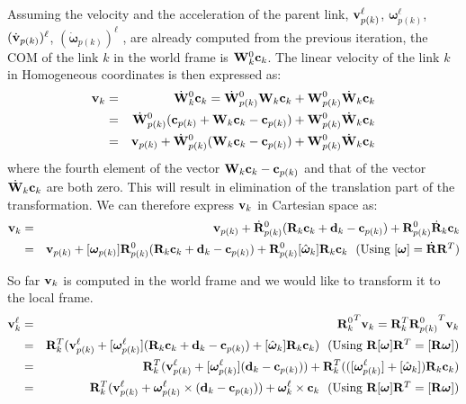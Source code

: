 Assuming the velocity and the acceleration of the parent
link, $\mathbf{v}_{p(k)}^\ell$, $\bm{\omega}_{p(k)}^\ell$,
$(\dot{\mathbf{v}}_{p(k)})^\ell$, $(\dot{\bm{\omega}}_{p(k)})^\ell$ , are
already computed from the previous iteration, the COM of the link $k$ in
the world frame is $\mathbf{W}^0_k \mathbf{c}_k$. The linear velocity of the
link $k$ in Homogeneous coordinates is then expressed as:
\begin{eqnarray}
\label{eqn:global_vel}
\mathbf{v}_k &=& \dot{\mathbf{W}}^0_k \mathbf{c}_k =  \dot{\mathbf{W}}^0_{p(k)} \mathbf{W}_k
\mathbf{c}_k + \mathbf{W}^0_{p(k)} \dot{\mathbf{W}}_k \mathbf{c}_k \nonumber \\ 
 &=& \dot{\mathbf{W}}^0_{p(k)} (\mathbf{c}_{p(k)} + \mathbf{W}_k \mathbf{c}_k -
\mathbf{c}_{p(k)}) + \mathbf{W}^0_{p(k)} \dot{\mathbf{W}}_k \mathbf{c}_k \nonumber \\
&=& \mathbf{v}_{p(k)} + \dot{\mathbf{W}}^0_{p(k)} (\mathbf{W}_k \mathbf{c}_k -
\mathbf{c}_{p(k)}) +\mathbf{W}^0_{p(k)} \dot{\mathbf{W}}_k \mathbf{c}_k
\end{eqnarray}
where the fourth element of the vector $\mathbf{W}_k \mathbf{c}_k -
\mathbf{c}_{p(k)}$ and that of the vector $\dot{\mathbf{W}}_k \mathbf{c}_k$ are both zero. This will
result in elimination of the translation part of the
transformation. We can therefore express $\mathbf{v}_k$ in Cartesian space
as:
\begin{eqnarray}
\mathbf{v}_k &=& \mathbf{v}_{p(k)} + \dot{\mathbf{R}}^0_{p(k)} (\mathbf{R}_k \mathbf{c}_k
+ \mathbf{d}_k - \mathbf{c}_{p(k)}) +\mathbf{R}^0_{p(k)} \dot{\mathbf{R}}_k \mathbf{c}_k \nonumber \\
&=& \mathbf{v}_{p(k)} + [\bm{\omega}_{p(k)}]\mathbf{R}^0_{p(k)} (\mathbf{R}_k
\mathbf{c}_k + \mathbf{d}_k -\mathbf{c}_{p(k)}) +\mathbf{R}^0_{p(k)}
[\hat{\bm{\omega}}_k]\mathbf{R}_k \mathbf{c}_k \mbox{\ \ (Using $[\bm{\omega}] = \dot{\mathbf{R}} \mathbf{R}^T$)}
\end{eqnarray}

So far $\mathbf{v}_k$ is computed in the world frame and we would like to
transform it to the local frame.
\begin{eqnarray}
\vc{v}_k^\ell &=& {\vc{R}_k^0}^T \vc{v}_k = \vc{R}_k^T
{\vc{R}^0_{p(k)}}^T \vc{v}_k \nonumber \\
&=& \vc{R}_k^T (\vc{v}_{p(k)}^\ell + [\bm{\omega}_{p(k)}^\ell] (\vc{R}_k
\vc{c}_k + \vc{d}_k -\vc{c}_{p(k)}) + [\hat{\bm{\omega}}_k] \vc{R}_k
\vc{c}_k) \mbox{\ \ (Using $\vc{R}[\bm{\omega}]\vc{R}^T =
  [\vc{R}\bm{\omega}]$)} \nonumber \\
&=& \vc{R}_k^T (\vc{v}_{p(k)}^\ell + [\bm{\omega}_{p(k)}^\ell]
(\vc{d}_k -\vc{c}_{p(k)})) + \vc{R}_k^T( ([\bm{\omega}_{p(k)}^\ell] + [\hat{\bm{\omega}}_k]) \vc{R}_k
\vc{c}_k) \nonumber \\
&=& \vc{R}_k^T (\vc{v}_{p(k)}^\ell + \bm{\omega}_{p(k)}^\ell \times
(\vc{d}_k -\vc{c}_{p(k)})) + \bm{\omega}_k^\ell \times \vc{c}_k \mbox{\ \ (Using $\vc{R}[\bm{\omega}]\vc{R}^T =
  [\vc{R}\bm{\omega}]$)} 
\end{eqnarray}

